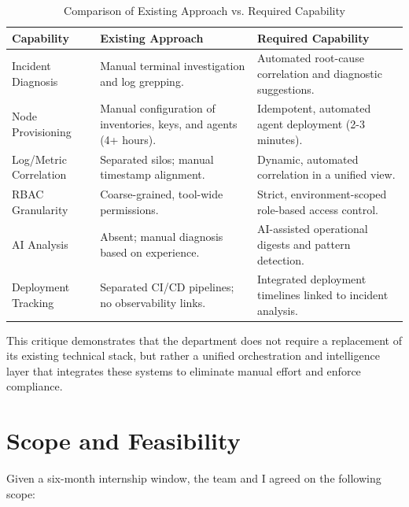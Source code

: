 \documentclass[12pt,a4paper]{report}
\begin{document}
\begin{table}[H]
\centering
\renewcommand{\arraystretch}{1.3}
\begin{tabular}{|l|p{6cm}|p{6cm}|}
\hline
\textbf{Capability} & \textbf{Existing Approach} & \textbf{Required Capability} \\
\hline
Incident Diagnosis & Manual terminal investigation and log grepping. & Automated root-cause correlation and diagnostic suggestions. \\
\hline
Node Provisioning & Manual configuration of inventories, keys, and agents (4+ hours). & Idempotent, automated agent deployment (2-3 minutes). \\
\hline
Log/Metric Correlation & Separated silos; manual timestamp alignment. & Dynamic, automated correlation in a unified view. \\
\hline
RBAC Granularity & Coarse-grained, tool-wide permissions. & Strict, environment-scoped role-based access control. \\
\hline
AI Analysis & Absent; manual diagnosis based on experience. & AI-assisted operational digests and pattern detection. \\
\hline
Deployment Tracking & Separated CI/CD pipelines; no observability links. & Integrated deployment timelines linked to incident analysis. \\
\hline
\end{tabular}
\caption{Comparison of Existing Approach vs. Required Capability}
\label{tab:existing_critique}
\end{table}

This critique demonstrates that the department does not require a replacement of its existing technical stack, but rather a unified orchestration and intelligence layer that integrates these systems to eliminate manual effort and enforce compliance.

\section{Scope and Feasibility}

Given a six-month internship window, the team and I agreed on the following scope:
\end{document}
